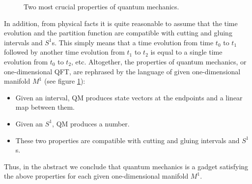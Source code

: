 \begin{figure}
\centering
  \subfloat[\label{}]{  %
    \begin{tikzpicture}[scale=1.0] %

        \draw[arrows=-latex] (0,0) -- (4,0) node[right] {time};
        \draw[thick, arrows=|-|] (0.8,0) node[above=0.2cm] (H0) {\normalsize $\mathcal{H}$} node[below=0.1] {$t_0$} -- (3.2,0) node[above=0.2cm] (H1) {\normalsize $\mathcal{H}$} node[below=0.1] {$t_1$};
        \draw[semithick, arrows=-to] (H0) to[bend left=30] node[above=0.2cm, pos=0.5] {\normalsize $e^{-(t_1 - t_0)H}$} (H1);

    \end{tikzpicture}
  }
  \qquad\qquad
  \subfloat[\label{}]{  %
    \begin{tikzpicture}[scale=1.0] %

        \draw[thick, arrows=|-] (1,0) node[right=0.1] {$t=0,\, \beta$} arc (0:360:1);
        \node at (0,0) {$S^1_{\beta}$};  %

        \node at (0.5,1.5) {\normalsize ${\rm Tr}_{\mathcal{H}} e^{-\beta H}$};

    \end{tikzpicture}
  }
  \caption{Two most crucial properties of quantum mechanics.}
  \label{fig:qm_two_properties}
\end{figure}


In addition, from physical facts it is quite reasonable to assume
that the time evolution and the partition function are compatible
with cutting and gluing intervals and $S^{1}$s. This simply means
that a time evolution from time $t_{0}$ to $t_{1}$ followed by
another time evolution from $t_{1}$ to $t_{2}$ is equal to a single
time evolution from $t_{0}$ to $t_{2}$, etc. Altogether, the properties
of quantum mechanics, or one-dimensional QFT, are rephrased by
the language of given one-dimensional manifold $M^{1}$ (see figure \ref{fig:qm_two_properties}):
\begin{itemize}
  \item Given an interval, QM produces state vectors at the endpoints and a linear
map between them.
  \item Given an $S^{1}$, QM produces a number.
  \item These two properties are compatible with cutting and gluing intervals and $S^{1}$s.
\end{itemize}
Thus, in the abstract we conclude that quantum
mechanics is a gadget satisfying the above properties for each given
one-dimensional manifold $M^{1}$.

